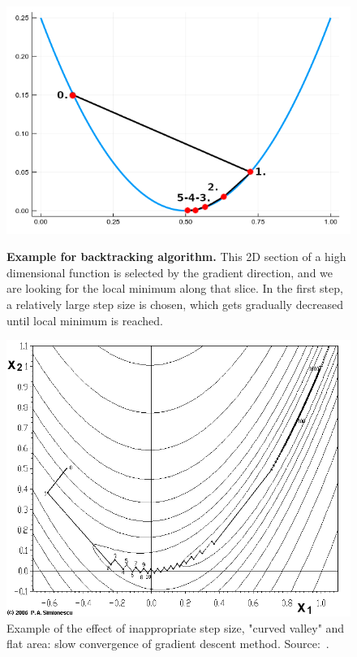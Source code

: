 \begin{figure}
    \centering
    \begin{minipage}[t]{0.40\linewidth}
        \centering
        \includegraphics[width=.8\linewidth]{images/backtracking.png}
        \caption{\textbf{Example for backtracking algorithm.} This 2D section of a high dimensional function is selected by the gradient direction, and we are looking for the local minimum along that slice. In the first step, a relatively large step size is chosen, which gets gradually decreased until local minimum is reached.}
        \label{fig:backtracking}
    \end{minipage}
    \hspace{0.01\linewidth}
    \begin{minipage}[t]{0.255\linewidth}
        \centering
        \includegraphics[width=\linewidth]{images/Banana-SteepDesc.png}
        \caption{Example of the effect of inappropriate step size, "curved valley" and flat area: slow convergence of gradient descent method. Source:~\cite{simionescu_illustration_2006}.}

\end{minipage}
\end{figure}
